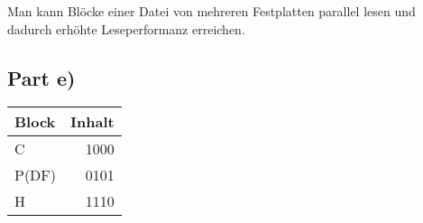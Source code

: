 \documentclass[10pt,a4paper]{article}
\begin{document}
Man kann Blöcke einer Datei von mehreren Festplatten parallel lesen und dadurch erhöhte Leseperformanz erreichen.

\subsection*{Part e)}

\begin{tabular}{lr}
Block & Inhalt\\
\hline
C & 1000\\
P(DF) & 0101\\
H & 1110\\
\end{tabular}
\begin{comment}
#+ORGTBL: SEND exercise-5-e orgtbl-to-latex :splice nil :skip 0
| Block | Inhalt |
|-------+--------|
| C     |   1000 |
| P(DF) |   0101 |
| H     |   1110 |
\end{comment}
\end{document}
